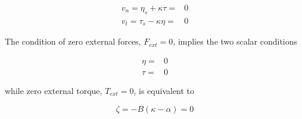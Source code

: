 $$
\begin{aligned}
v_n = \eta_s + \kappa \tau = & 0 \\
v_t = \tau_s - \kappa \eta = & 0
\end{aligned}
$$

The condition of zero external forces, $F_{ext} = 0$, implies the two scalar conditions

$$
\begin{aligned}
\eta = &0 \\
\tau = &0
\end{aligned}
$$

while zero external torque, $T_{ext} = 0$, is equivalent to 

$$
\zeta = -B(\kappa-\alpha) = 0
$$


